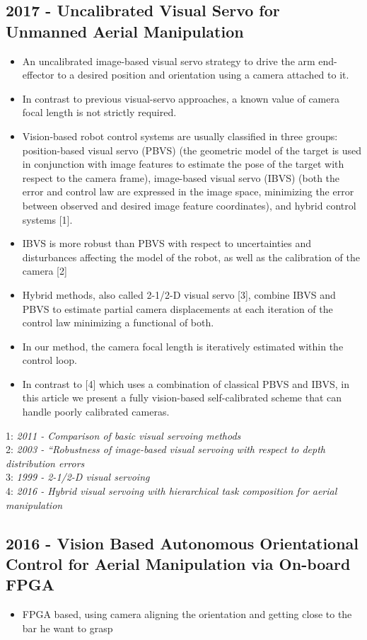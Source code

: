 \subsection{2017 - Uncalibrated Visual Servo for Unmanned Aerial Manipulation}
\begin{itemize}
\item An uncalibrated image-based visual servo strategy to drive the arm end-effector to a desired position and orientation using a camera attached to it. 
\item In contrast to previous visual-servo approaches, a known value of camera focal length is not strictly required. 
\item Vision-based robot control systems are usually classified in three groups: position-based visual servo (PBVS) (the geometric model of the target is used in conjunction with image features to estimate the pose of the target with respect to the camera frame), image-based visual servo (IBVS) (both the error and control law are expressed in the image space, minimizing the error between observed and desired image feature coordinates), and hybrid control systems [1].
\item IBVS is more robust than PBVS with respect to uncertainties and disturbances affecting the model of the robot, as well as the calibration of the camera [2]
\item  Hybrid methods, also called 2-1/2-D visual servo [3], combine IBVS and PBVS to estimate partial camera displacements at each iteration of the control law minimizing a functional of both.
\item In our method, the camera focal length is iteratively estimated within the control loop.
\item In contrast to [4] which uses a combination of classical PBVS and IBVS, in this article we present a fully vision-based self-calibrated scheme that can handle poorly calibrated cameras.
\end{itemize}
1: \textit{2011 - Comparison of basic visual servoing methods} \\
2: \textit{2003 - “Robustness of image-based visual servoing with respect to depth distribution errors} \\
3: \textit{1999 - 2-1/2-D visual servoing} \\
4: \textit{2016 - Hybrid visual servoing with hierarchical task composition for aerial manipulation}


\subsection{2016 - Vision Based Autonomous Orientational Control for Aerial Manipulation via On-board FPGA}
\begin{itemize}
\item FPGA based, using camera aligning the orientation and getting close to the bar he want to grasp
\end{itemize}


